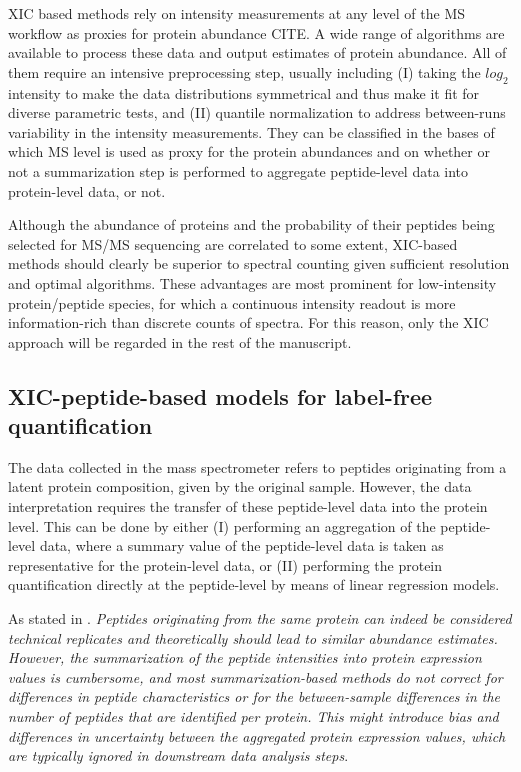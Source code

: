 \documentclass[11pt, a4paper]{report}
\begin{document}
\ac{XIC} based methods rely on intensity measurements at any level of the \ac{MS} workflow as proxies for protein abundance CITE. A wide range of algorithms are available to process these data and output estimates of protein abundance. All of them require an intensive preprocessing step, usually including (I) taking the $log_2$ intensity to make the data distributions symmetrical and thus make it fit for diverse parametric tests, and (II) quantile normalization to address between-runs variability in the intensity measurements. They can be classified in the bases of which MS level is used as proxy for the protein abundances and on whether or not a summarization step is performed to aggregate peptide-level data into protein-level data, or not. 


Although the abundance of proteins and the probability of their peptides being selected for \ac{MS/MS} sequencing are correlated to some extent, \ac{XIC}-based methods should clearly be superior to spectral counting given sufficient resolution and optimal algorithms. These advantages are most prominent for low-intensity protein/peptide species, for which a continuous intensity readout is more information-rich than discrete counts of spectra. \cite{Cox2014} For this reason, only the \ac{XIC} approach will be regarded in the rest of the manuscript.  


\subsection{\ac{XIC}-peptide-based models for label-free quantification}
\label{subsec:peptide_model}

The data collected in the mass spectrometer refers to peptides originating from a latent protein composition, given by the original sample. However, the data interpretation requires the transfer of these peptide-level data into the protein level. This can be done by either (I) performing an aggregation of the peptide-level data, where a summary value of the peptide-level data is taken as representative for the protein-level data, or (II) performing the protein quantification directly at the peptide-level by means of linear regression models.

As stated in \cite{Goeminne2015}. \textit{Peptides originating from the same protein can indeed be considered technical replicates and theoretically should lead to similar abundance estimates. However, the summarization of the peptide intensities into protein expression values is cumbersome, and most summarization-based methods do not correct for differences in peptide characteristics or for the between-sample differences in the number of peptides that are identified per protein. This might introduce bias and differences in uncertainty between the aggregated protein expression values, which are typically ignored in downstream data analysis steps}.
\end{document}
